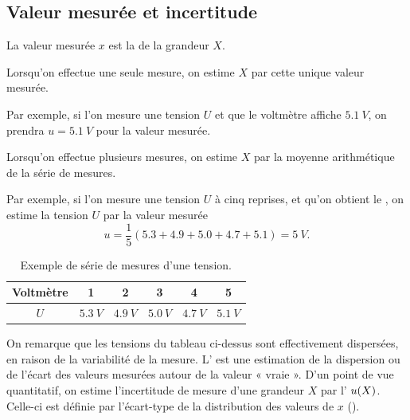 
\subsection{Valeur mesurée et incertitude}


La valeur mesurée $x$ est la  de la grandeur $X$.
\begin{liste}
\item
Lorsqu’on effectue une seule mesure, on estime $X$ par cette unique valeur mesurée.

\begin{remarque}
 Par exemple, si l’on mesure une tension $U$ et que le voltmètre affiche $\SI{5.1}{V}$, on prendra $u=\SI{5.1}{V}$ pour la valeur mesurée.
 \end{remarque}
\item Lorsqu’on effectue plusieurs mesures, on estime $X$ par la moyenne arithmétique de la série de mesures.

\begin{remarque}
 Par exemple, si l’on mesure une tension $U$ à cinq reprises, et qu’on obtient le , on estime la tension $U$ par la valeur mesurée 
 $$u=\frac{1}{5}(\num{5.3}+\num{4.9}+\num{5.0}+\num{4.7}+\num{5.1})=\SI{5}{V}.$$

 \end{remarque}

\begin{table}[h!]
\centering
\begin{tabular}{|c|c|c|c|c|c|}
\hline
Voltmètre &1&2&3&4&5\\
\hline
$U$ & $\SI{5.3}{V}$ &$\SI{4.9}{V}$ &$\SI{5.0}{V}$ &$\SI{4.7}{V}$ &$\SI{5.1}{V}$ \\
\hline
\end{tabular}
\caption{Exemple de série de mesures d’une tension.}
\label{tab:u}
\end{table}



\end{liste}

On remarque que les tensions du tableau ci-dessus sont effectivement dispersées, en raison de la variabilité de la mesure. L’ est une estimation de la dispersion ou de l’écart des valeurs mesurées autour de la valeur « vraie ». D’un point de vue quantitatif, on estime l’incertitude de mesure d’une grandeur $X$ par l’ $\incertX x$. Celle-ci est définie par l’écart-type de la distribution des valeurs de $x$ ().


